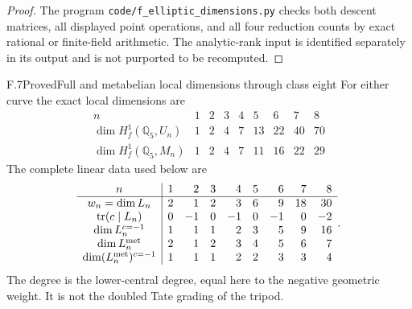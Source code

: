 \begin{proof}
The program \texttt{code/f\_elliptic\_dimensions.py} checks both descent
matrices, all displayed point operations, and all four reduction counts
by exact rational or finite-field arithmetic. The analytic-rank input is
identified separately in its output and is not purported to be recomputed.
\end{proof}

\begin{statement}{F.7}{Proved}{Full and metabelian local dimensions through class eight}
For either curve the exact local dimensions are
\[
 \begin{array}{c|rrrrrrrr}
 n&1&2&3&4&5&6&7&8\\\hline
 \dim H_f^1(\mathbb Q_5,U_n)&1&2&4&7&13&22&40&70\\
 \dim H_f^1(\mathbb Q_5,M_n)&1&2&4&7&11&16&22&29
 \end{array}
\]
The complete linear data used below are
\[
 \begin{array}{c|rrrrrrrr}
 n&1&2&3&4&5&6&7&8\\\hline
 w_n=\dim L_n&2&1&2&3&6&9&18&30\\
 \operatorname{tr}(c\mid L_n)&0&-1&0&-1&0&-1&0&-2\\
 \dim L_n^{c=-1}&1&1&1&2&3&5&9&16\\
 \dim L_n^{\rm met}&2&1&2&3&4&5&6&7\\
 \dim (L_n^{\rm met})^{c=-1}&1&1&1&2&2&3&3&4
 \end{array}.
\]
The degree is the lower-central degree, equal here to the negative
geometric weight. It is not the doubled Tate grading of the tripod.
\end{statement}
